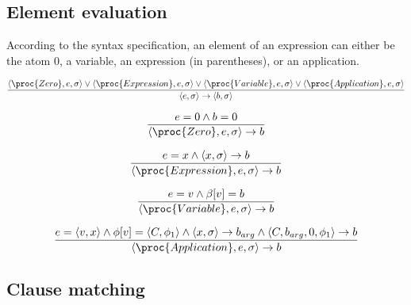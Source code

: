 \subsection{Element evaluation}

According to the syntax specification, an element of an expression can either
be the atom $0$, a variable, an expression (in parentheses), or an application. 

\begin{equation}
{\displaystyle
  \left\langle \proc{Zero}, e,\sigma\right\rangle
\vee 
  \left\langle \proc{Expression}, e,\sigma\right\rangle
\vee
  \left\langle \proc{Variable}, e,\sigma\right\rangle
\vee
  \left\langle \proc{Application}, e,\sigma\right\rangle
\over\displaystyle
  \left\langle e,\sigma\right\rangle
  \rightarrow
  \left\langle b,\sigma\right\rangle
}
\end{equation}

\begin{equation}
{\displaystyle
  e = 0
\wedge
  b = 0
\over\displaystyle
  \left\langle \proc{Zero}, e,\sigma\right\rangle
  \rightarrow
  b
}
\end{equation}

\begin{equation}
{\displaystyle
  e = x
\wedge
  \left\langle x,\sigma\right\rangle
  \rightarrow
  b
\over\displaystyle
  \left\langle \proc{Expression}, e,\sigma\right\rangle
  \rightarrow
  b
}
\end{equation}

\begin{equation}
{\displaystyle
  e = v
\wedge
  \beta[v]=b
\over\displaystyle
  \left\langle \proc{Variable}, e,\sigma\right\rangle
  \rightarrow
  b
}
\end{equation}

\begin{equation}
{\displaystyle
  e = \left\langle v, x\right\rangle
\wedge
  \phi[v]=\left\langle C,\phi_1 \right\rangle
\wedge
  \left\langle x,\sigma\right\rangle
  \rightarrow
  b_{arg}
\wedge
  \left\langle C,b_{arg},0,\phi_1\right\rangle
  \rightarrow
  b
\over\displaystyle
  \left\langle \proc{Application}, e,\sigma\right\rangle
  \rightarrow
  b
}
\end{equation}

\subsection{Clause matching}


